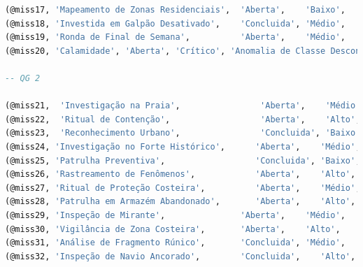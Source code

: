 \documentclass[12pt,a4paper]{report}
\begin{document}
\begin{lstlisting}[language=SQL, caption=population.sql]
(@miss17, 'Mapeamento de Zonas Residenciais',  'Aberta',    'Baixo',  'Coletar dados de rotina',           '2025-05-29 08:00:00', NULL,         @addr47, @hq1),
(@miss18, 'Investida em Galpão Desativado',    'Concluida', 'Médio',  'Verificar movimentações ocultas',   '2025-04-14 15:00:00', '2025-04-15', @addr48, @hq1),
(@miss19, 'Ronda de Final de Semana',          'Aberta',    'Médio',  'Patrulhar centros culturais',       '2025-06-01 19:00:00', NULL,         @addr49, @hq1),
(@miss20, 'Calamidade', 'Aberta', 'Crítico', 'Anomalia de Classe Desconhecida detectada. Convergência de forças extraplanares em escala nunca registrada. Mobilização total autorizada.', '2021-09-04 00:00:00', NULL, @addr100, @hq1),

-- QG 2

(@miss21,  'Investigação na Praia',                'Aberta',    'Médio',  'Coletar testemunhos',            '2025-05-10 06:00:00', NULL,         @addr4,  @hq2),
(@miss22,  'Ritual de Contenção',                  'Aberta',    'Alto',   'Conter manifestação',            '2025-05-12 20:00:00', NULL,         @addr5,  @hq2),
(@miss23,  'Reconhecimento Urbano',                'Concluida', 'Baixo',  'Mapear pontos quentes',          '2025-04-20 10:00:00', '2025-04-21', @addr6,  @hq2),
(@miss24, 'Investigação no Forte Histórico',      'Aberta',    'Médio',  'Coletar artefatos',              '2025-02-15 08:30:00', NULL,         @addr10, @hq2),
(@miss25, 'Patrulha Preventiva',                  'Concluida', 'Baixo',  'Vistorias de rotina',            '2025-03-01 06:00:00', '2025-03-05', @addr11, @hq2),
(@miss26, 'Rastreamento de Fenômenos',            'Aberta',    'Alto',   'Registrar ocorrências estranhas','2025-04-10 21:00:00', NULL,         @addr12, @hq2),
(@miss27, 'Ritual de Proteção Costeira',          'Aberta',    'Médio',  'Erguer barreiras energéticas',   '2025-04-05 05:45:00', NULL,         @addr18, @hq2),
(@miss28, 'Patrulha em Armazém Abandonado',       'Aberta',    'Alto',   'Documentar estranhezas',         '2025-04-12 13:00:00', NULL,         @addr24, @hq2),
(@miss29, 'Inspeção de Mirante',               'Aberta',    'Médio',  'Evitar invasões astrais',           '2025-05-21 06:00:00', NULL,         @addr50, @hq2),
(@miss30, 'Vigilância de Zona Costeira',       'Aberta',    'Alto',   'Detectar portais dimensionais',     '2025-05-22 04:00:00', NULL,         @addr51, @hq2),
(@miss31, 'Análise de Fragmento Rúnico',       'Concluida', 'Médio',  'Investigar inscrições antigas',     '2025-04-10 16:00:00', '2025-04-11', @addr52, @hq2),
(@miss32, 'Inspeção de Navio Ancorado',        'Concluida',    'Alto',   'Averiguar distorções temporais', '2025-03-24 02:30:00','2025-05-25',  @addr53, @hq2),

\end{lstlisting}
\end{document}
